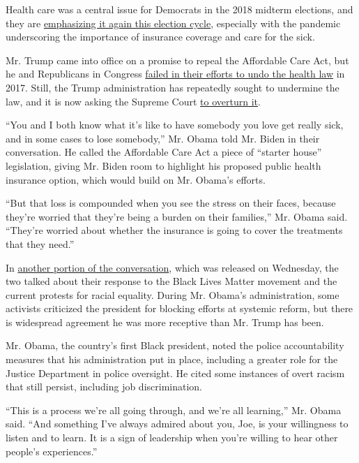Health care was a central issue for Democrats in the 2018 midterm
elections, and they are
\href{https://www.nytimes.com/2020/03/26/us/politics/coronavirus-health-care.html}{emphasizing
it again this election cycle}, especially with the pandemic underscoring
the importance of insurance coverage and care for the sick.

Mr. Trump came into office on a promise to repeal the Affordable Care
Act, but he and Republicans in Congress
\href{https://www.nytimes.com/2017/07/27/us/politics/obamacare-partial-repeal-senate-republicans-revolt.html}{failed
in their efforts to undo the health law} in 2017. Still, the Trump
administration has repeatedly sought to undermine the law, and it is now
asking the Supreme Court
\href{https://www.nytimes.com/2020/06/26/us/politics/obamacare-trump-administration-supreme-court.html}{to
overturn it}.

``You and I both know what it's like to have somebody you love get
really sick, and in some cases to lose somebody,'' Mr. Obama told Mr.
Biden in their conversation. He called the Affordable Care Act a piece
of ``starter house'' legislation, giving Mr. Biden room to highlight his
proposed public health insurance option, which would build on Mr.
Obama's efforts.

``But that loss is compounded when you see the stress on their faces,
because they're worried that they're being a burden on their families,''
Mr. Obama said. ``They're worried about whether the insurance is going
to cover the treatments that they need.''

In
\href{https://twitter.com/JoeBiden/status/1286003073786281985}{another
portion of the conversation}, which was released on Wednesday, the two
talked about their response to the Black Lives Matter movement and the
current protests for racial equality. During Mr. Obama's administration,
some activists criticized the president for blocking efforts at systemic
reform, but there is widespread agreement he was more receptive than Mr.
Trump has been.

Mr. Obama, the country's first Black president, noted the police
accountability measures that his administration put in place, including
a greater role for the Justice Department in police oversight. He cited
some instances of overt racism that still persist, including job
discrimination.

``This is a process we're all going through, and we're all learning,''
Mr. Obama said. ``And something I've always admired about you, Joe, is
your willingness to listen and to learn. It is a sign of leadership when
you're willing to hear other people's experiences.''

